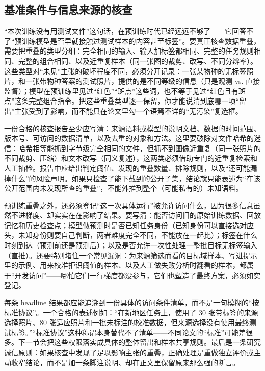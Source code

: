 \subsection{基准条件与信息来源的核查}
\label{sec:ket-evaluation-provenance}

“本次训练没有用测试文件”这句话，在预训练时代已经远远不够了——它回答不了“预训练模型是否早就接触过测试样本的内容甚至标签”。要真正核查数据重叠，需要把重叠的类型分细：完全相同的输入、输入加标签都相同、完整的任务规则相同、完整的组合相同、以及近重复样本（同一张图的裁剪、改写、不同分辨率）。这些类型对“未见”主张的破坏程度不同，必须分开记录：一张某物种的无标签照片，和一张带物种答案的测试照片，提供的是不同等级的信息（只是观测 vs. 直接监督）；模型在预训练里见过“红色”“斑点”这些词，也不等于见过“红色且有斑点”这条完整组合指令。把这些重叠类型逐一保留，你才能说清到底哪一项“留出”主张受到了影响，而不能只在论文里勾一个语焉不详的“无污染”复选框。

一份合格的核查报告至少应写清：来源语料或模型的说明文档、数据的时间范围、版本号、可访问的数据清单，以及去重的对象和方法。这里要破除对文件哈希的迷信：哈希相等能抓到字节级完全相同的文件，但抓不到图像近重复（同一张照片的不同裁剪、压缩）和文本改写（同义复述），这两类必须借助专门的近重复检索和人工抽检。报告中应给出判定阈值、发现的重叠数量、排除规则，以及“还可能漏掉什么”的风险声明。如果只检查了能下载到的公开子集，结论就只能表述为“在该公开范围内未发现所查的重叠”，不能外推到整个（可能私有的）未知语料。

预训练重叠之外，还必须登记“这一次具体运行”被允许访问什么，因为很多信息虽然不进梯度、却实实在在影响了结果。要写清：能否访问旧的原始训练数据、回放记忆和历史检查点；模型做预测时是否已知任务身份（已知身份可以直接选对应头，未知身份则要自己判断，两者难度完全不同，不能放在一起比）；标签在什么时刻到达（预测前还是预测后）；以及是否允许一次性处理一整批目标无标签输入（直推）。还要特别堵住一个常见漏洞：为来源筛选而看的目标域样本、写进提示里的示例、用来校准拒识阈值的样本、以及人工做失败分析时翻看的样本，都属于“开发访问”——哪怕它们一行梯度都没参与，它们也塑造了最终方案，必须如实登记。

每条 headline 结果都应能追溯到一份具体的访问条件清单，而不是一句模糊的“按标准协议”。一个合格的表述例如：“在新地区任务上，使用了 30 张带标签的来源选择照片、80 张适应照片和一批未标注的校准数据，但来源选择没有使用最终测试标签。”“标准协议”这种称谓本身替代不了清单——不同论文的“标准”可能差很多。下一节会把这些权限落实成具体的整体留出和样本共享规则。最后是一条研究诚信原则：如果核查中发现了足以影响主张的重叠，正确处理是重做独立评价或主动收窄结论，而不是加一条脚注说明、却在正文里保留原来那么强的断言。

